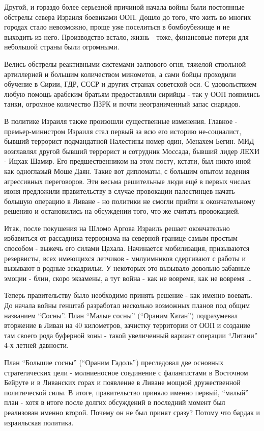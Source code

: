 Другой, и гораздо более серьезной причиной начала войны были постоянные обстрелы севера Израиля боевиками ООП. Дошло до того, что жить во многих городах стало невозможно, проще уже поселиться в бомбоубежище и не выходить из него. Производство встало, жизнь - тоже, финансовые потери для небольшой страны были огромными.

Велись обстрелы реактивными системами залпового огня, тяжелой ствольной артиллерией и большим количеством минометов, а сами бойцы проходили обучение в Сирии, ГДР, СССР и других странах советской оси. С удовольствием любую помощь арабским братьям предоставляли сирийцы - так у ООП появились танки, огромное количество ПЗРК и почти неограниченный запас снарядов.

В политике Израиля также произошли существенные изменения. Главное - премьер-министром Израиля стал первый за всю его историю не-социалист, бывший террорист подмандатной Палестины номер один, Менахем Бегин. МИД возглавлял другой бывший террорист и сотрудник Моссада, бывший лидер ЛЕХИ - Ицхак Шамир. Его предшественником на этом посту, кстати, был никто иной как одноглазый Моше Даян. Такие вот дипломаты, с большим опытом ведения агрессивных переговоров. Эти весьма решительные люди ещё в первых числах июня предложили правительству в случае провокации палестинцев начать большую операцию в Ливане - но политики не смогли прийти к окончательному решению и остановились на обсуждении того, что же считать провокацией.

Итак, после покушения на Шломо Аргова Израиль решает окончательно избавиться от рассадника терроризма на северной границе самым простым способом - выжечь его силами Цахала. Начинается мобилизация, призываются резервисты, всех имеющихся летчиков - милуимников сдергивают с работы и вызывают в родные эскадрильи. У некоторых это вызывало довольно забавные эмоции - блин, скоро экзамены, а тут война - как не вовремя, как не вовремя …

Теперь правительству было необходимо принять решение - как именно воевать. До начала войны генштаб разработал несколько возможных планов под общим названием “Сосны”. План “Малые сосны” (“Ораним Катан”) подразумевал вторжение в Ливан на 40 километров, зачистку территории от ООП и создание там своего рода буферной зоны - такой увеличенный вариант операции “Литани” 4-х летней давности.

План “Большие сосны” (“Ораним Гадоль”) преследовал две основных стратегических цели - молниеносное соединение с фалангистами в Восточном Бейруте и в Ливанских горах и появление в Ливане мощной дружественной политической силы. В итоге, правительство приняло именно первый, “малый” план - хотя в итоге после долгих обсуждений в последний момент был реализован именно второй. Почему он не был принят сразу? Потому что бардак и израильская политика.

